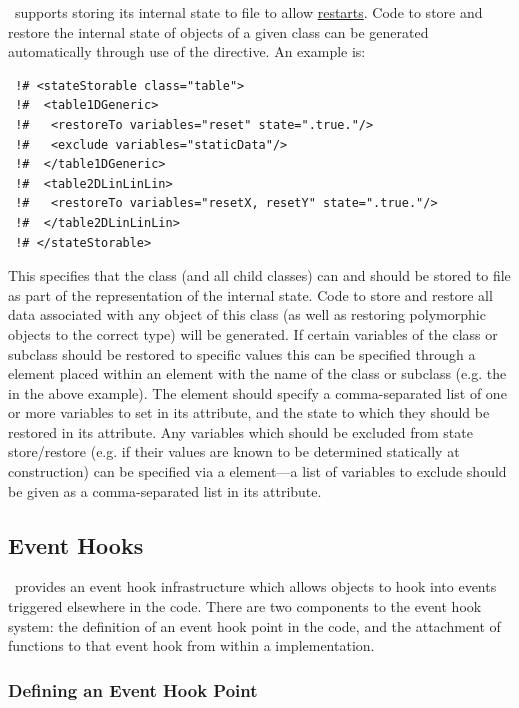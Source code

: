 \glc\ supports storing its internal state to file to allow \href{https://github.com/galacticusorg/galacticus/releases/download/bleeding-edge/Galacticus_Usage.pdf\#sec.Restarting}{restarts}. Code to store and restore the internal state of objects of a given class can be generated automatically through use of the  directive. An example is:
\begin{verbatim}
 !# <stateStorable class="table">
 !#  <table1DGeneric>
 !#   <restoreTo variables="reset" state=".true."/>
 !#   <exclude variables="staticData"/>
 !#  </table1DGeneric>
 !#  <table2DLinLinLin>
 !#   <restoreTo variables="resetX, resetY" state=".true."/>
 !#  </table2DLinLinLin>  
 !# </stateStorable>
\end{verbatim}
This specifies that the  class (and all child classes) can and should be stored to file as part of the representation of the internal state. Code to store and restore all data associated with any object of this class (as well as restoring polymorphic objects to the correct type) will be generated. If certain variables of the class or subclass should be restored to specific values this can be specified through a  element placed within an element with the name of the class or subclass (e.g. the  in the above example). The  element should specify a comma-separated list of one or more variables to set in its  attribute, and the state to which they should be restored in its  attribute. Any variables which should be excluded from state store/restore (e.g. if their values are known to be determined statically at construction) can be specified via a  element---a list of variables to exclude should be given as a comma-separated list in its  attribute.

\subsection{Event Hooks}\label{sec:eventHooks}

\glc\ provides an event hook infrastructure which allows  objects to hook into events triggered elsewhere in the code. There are two components to the event hook system: the definition of an event hook point in the code, and the attachment of functions to that event hook from within a  implementation.

\subsubsection{Defining an Event Hook Point}

